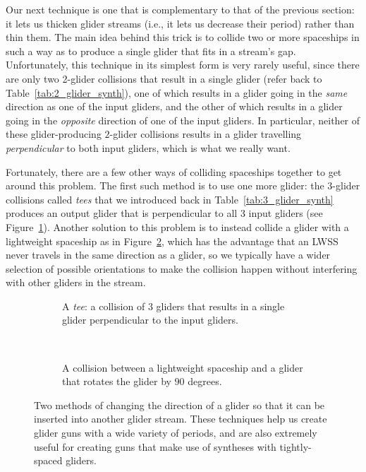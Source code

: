Our next technique is one that is complementary to that of the previous section: it lets us thicken glider streams (i.e., it lets us decrease their period) rather than thin them. The main idea behind this trick is to collide two or more spaceships in such a way as to produce a single glider that fits in a stream's gap. Unfortunately, this technique in its simplest form is very rarely useful, since there are only two 2-glider collisions that result in a single glider (refer back to Table~\ref{tab:2_glider_synth}), one of which results in a glider going in the \emph{same} direction as one of the input gliders, and the other of which results in a glider going in the \emph{opposite} direction of one of the input gliders. In particular, neither of these glider-producing $2$-glider collisions results in a glider travelling \emph{perpendicular} to both input gliders, which is what we really want.

Fortunately, there are a few other ways of colliding spaceships together to get around this problem. The first such method is to use one more glider: the $3$-glider collisions called \emph{tees} that we introduced back in Table~\ref{tab:3_glider_synth} produces an output glider that is perpendicular to all $3$ input gliders (see Figure~\ref{fig:tee}). Another solution to this problem is to instead collide a glider with a lightweight spaceship as in Figure~\ref{fig:lwss_reflect_glider}, which has the advantage that an LWSS never travels in the same direction as a glider, so we typically have a wider selection of possible orientations to make the collision happen without interfering with other gliders in the stream.

\begin{figure}[!htb]
	\centering
	\begin{subfigure}{.48\textwidth}
		\centering
		\caption{A \emph{tee}: a collision of $3$ gliders that results in a single glider perpendicular to the input gliders.}
		\label{fig:tee}
	\end{subfigure} \ \ \ \ %
	\begin{subfigure}{.48\textwidth}
		\centering
		\caption{A collision between a lightweight spaceship and a glider that rotates the glider by $90$ degrees.}
		\label{fig:lwss_reflect_glider}
	\end{subfigure}
	\caption{Two methods of changing the direction of a glider so that it can be inserted into another glider stream. These techniques help us create glider guns with a wide variety of periods, and are also extremely useful for creating guns that make use of syntheses with tightly-spaced gliders.}\label{fig:glider_insert_methods}
\end{figure}

